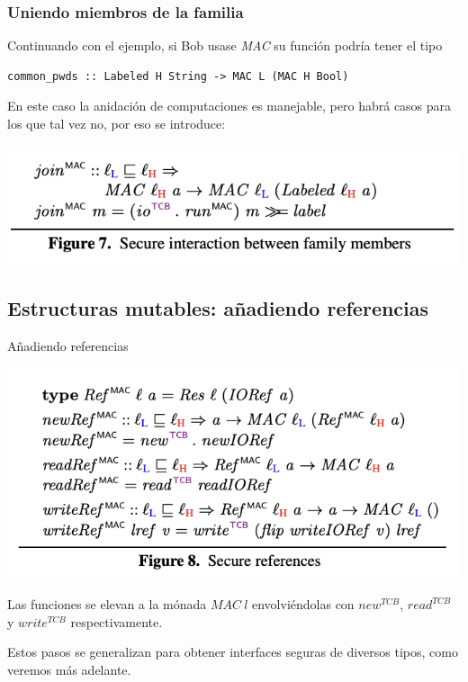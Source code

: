 \documentclass{beamer}
\begin{document}
\begin{frame}[fragile]
    \frametitle{Uniendo miembros de la familia}
    Continuando con el ejemplo, si Bob usase \textit{MAC} su función podría tener el tipo

    \begin{lstlisting}
common_pwds :: Labeled H String -> MAC L (MAC H Bool)
    \end{lstlisting}
    
    En este caso la anidación de computaciones es manejable, pero habrá casos para los que tal vez no, por eso se introduce:

    \begin{center}
        \includegraphics[scale=0.8]{figure7.png}
    \end{center}
\end{frame}

\subsection{Estructuras mutables: añadiendo referencias}

\begin{frame}{Añadiendo referencias}
    \begin{center}
        \includegraphics[scale=0.7]{figure8.png}
    \end{center}

    Las funciones se elevan a la mónada $MAC \ l$ envolviéndolas con $new^{TCB}$, $read^{TCB}$ y $write^{TCB}$ respectivamente. 

    Estos pasos se generalizan para obtener interfaces seguras de diversos tipos, como veremos más adelante.
\end{frame}
\end{document}
